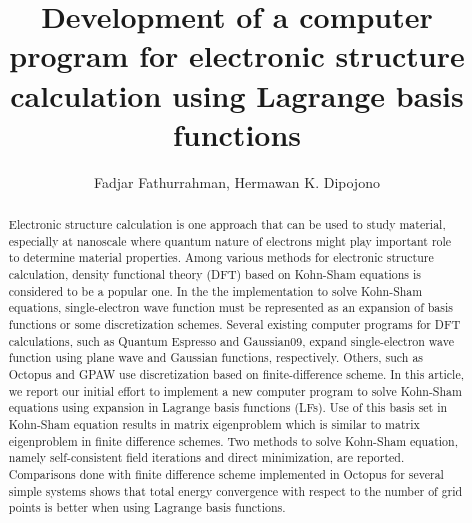 \documentclass[%
reprint, floatfix, amsmath, amssymb, aps]{revtex4-1}
\begin{document}
\title{Development of a computer program for electronic structure calculation using Lagrange basis functions}
\author{Fadjar Fathurrahman, Hermawan K. Dipojono}

\begin{abstract}
Electronic structure calculation is one approach that can be used to study material,
especially at nanoscale where quantum nature of electrons might play important role
to determine material properties. Among various methods for electronic structure calculation,
density functional theory (DFT) based on Kohn-Sham equations is considered to be a popular one.
In the the implementation to solve Kohn-Sham equations, single-electron wave function must be
represented as an expansion of basis functions or some discretization schemes. Several
existing computer programs for DFT calculations, such as  Quantum Espresso and Gaussian09,
expand single-electron wave function using plane wave and Gaussian functions, respectively.
Others, such as Octopus and GPAW use discretization based on finite-difference scheme.
In this article, we report our initial effort to implement a new computer program to
solve Kohn-Sham equations using expansion in Lagrange basis functions (LFs).
Use of this basis set in Kohn-Sham equation results in matrix eigenproblem which
is similar to matrix eigenproblem in finite difference schemes. Two methods to solve
Kohn-Sham equation, namely self-consistent field iterations and direct minimization,
are reported. Comparisons done with finite difference scheme implemented in Octopus
for several simple systems shows that total energy convergence with respect to the number
of grid points is better when using Lagrange basis functions.
\end{abstract}

\maketitle











\end{document}
